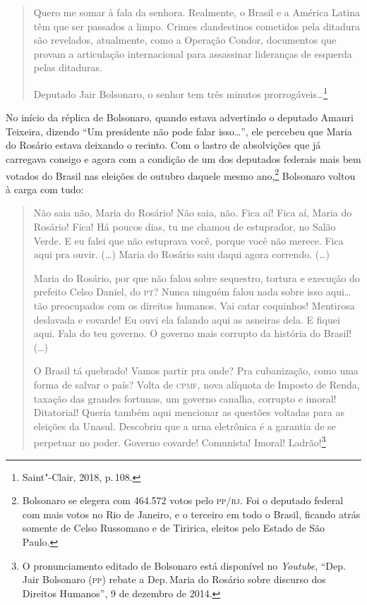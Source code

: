 \begin{quote}
Quero me somar à fala da senhora. Realmente, o Brasil e a América Latina
têm que ser passados a limpo. Crimes clandestinos cometidos pela
ditadura são revelados, atualmente, como a Operação Condor, documentos
que provam a articulação internacional para assassinar lideranças de
esquerda pelas ditaduras.

Deputado Jair Bolsonaro, o senhor tem três minutos
prorrogáveis\ldots{}\footnote{Saint"-Clair, 2018, p.\,108.}
\end{quote}

No início da réplica de Bolsonaro, quando estava advertindo o deputado
Amauri Teixeira, dizendo ``Um presidente não pode falar isso\ldots{}'', ele
percebeu que Maria do Rosário estava deixando o recinto. Com o lastro de
absolvições que já carregava consigo e agora com a condição de um dos
deputados federais mais bem votados do Brasil nas eleições de outubro
daquele mesmo ano,\footnote{Bolsonaro se elegera com 464.572 votos pelo
  \textsc{pp}/\textsc{rj}. Foi o deputado federal com mais votos no Rio de Janeiro, e o
  terceiro em todo o Brasil, ficando atrás somente de Celso Russomano e
  de Tiririca, eleitos pelo Estado de São Paulo.} Bolsonaro voltou à
carga com tudo:

\begin{quote}
Não saia não, Maria do Rosário! Não saia, não. Fica aí! Fica aí, Maria
do Rosário! Fica! Há poucos dias, tu me chamou de estuprador, no Salão
Verde. E eu falei que não estuprava você, porque você não merece. Fica
aqui pra ouvir. (\ldots{}) Maria do Rosário saiu daqui agora correndo. (\ldots{})

Maria do Rosário, por que não falou sobre sequestro, tortura e execução
do prefeito Celso Daniel, do \textsc{pt}? Nunca ninguém falou nada sobre isso
aqui\ldots{} tão preocupados com os direitos humanos. Vai catar coquinhos!
Mentirosa deslavada e covarde! Eu ouvi ela falando aqui as asneiras
dela. E fiquei aqui. Fala do teu governo. O governo mais corrupto da
história do Brasil! (\ldots{})

O Brasil tá quebrado! Vamos partir pra onde? Pra cubanização, como uma
forma de salvar o país? Volta de \textsc{cpmf}, nova alíquota de Imposto de
Renda, taxação das grandes fortunas, um governo canalha, corrupto e
imoral! Ditatorial! Queria também aqui mencionar as questões voltadas
para as eleições da Unasul. Descobriu que a urna eletrônica é a garantia
de se perpetuar no poder. Governo covarde! Comunista! Imoral!
Ladrão!\footnote{O pronunciamento editado de Bolsonaro está disponível no
  \emph{Youtube}, ``Dep.\,Jair Bolsonaro (\textsc{pp}) rebate a Dep.\,Maria do Rosário sobre discurso dos Direitos Humanos'', 9 de dezembro de 2014.}
\end{quote}

